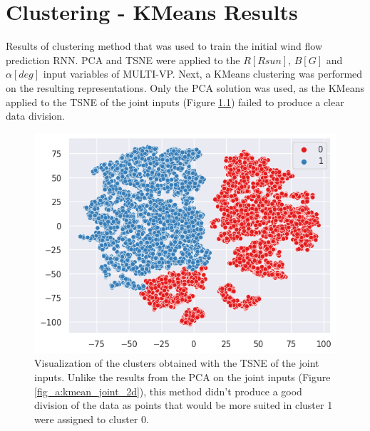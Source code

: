\chapter{Clustering - KMeans Results}\label{apdx:cluster_res}
Results of clustering method that was used to train the initial wind flow prediction RNN. PCA and TSNE were applied to the $R [Rsun]$, $B [G]$ and $\alpha [deg]$ input variables of MULTI-VP. Next, a KMeans clustering was performed on the resulting representations. Only the PCA solution was used, as the KMeans applied to the TSNE of the joint inputs (Figure \ref{fig_a:tsne_joint_kmeans_2}) failed to produce a clear data division.

\begin{figure} [h]
    \caption[Visualization of the clusters obtained with the TSNE of the joint inputs.]{Visualization of the clusters obtained with the TSNE of the joint inputs. Unlike the results from the PCA on the joint inputs (Figure \ref{fig_a:kmean_joint_2d}), this method didn't produce a good division of the data as points that would be more suited in cluster 1 were assigned to cluster 0.}
    \label{fig_a:tsne_joint_kmeans_2}
    \centering
    \includegraphics[width=\textwidth]{figures/tsne_joint_kmeans_2.png}
\end{figure}

\clearpage
